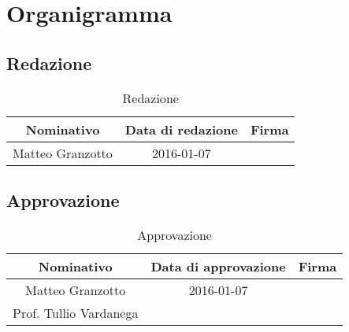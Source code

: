 \newpage
\section{Organigramma}
\subsection{Redazione}
\begin{table}[htbp]
	\begin{center}
		\setlength{\extrarowheight}{\jot}
		\begin{tabular}{|c|c|p{6cm}|}
			\hline
			\textbf{Nominativo} & \textbf{Data di redazione} & \textbf{Firma} \\[1ex]
			\hline
			Matteo Granzotto & 2016-01-07 & \\[1ex]
			\hline
		\end{tabular}
	\end{center}
	\caption{Redazione}
\end{table}

\subsection{Approvazione}
\begin{table}[htbp]
	\begin{center}
		\setlength{\extrarowheight}{\jot}
		\begin{tabular}{|c|c|p{5cm}|}
			\hline
			\textbf{Nominativo}     & \textbf{Data di approvazione} & \textbf{Firma}  \\[1ex]
			\hline
			Matteo Granzotto		& 2016-01-07					&			\\[1ex]
			\hline
			Prof. Tullio Vardanega	&								&			\\[1ex]
			\hline
		\end{tabular}
	\end{center}
	\caption{Approvazione}
\end{table}

